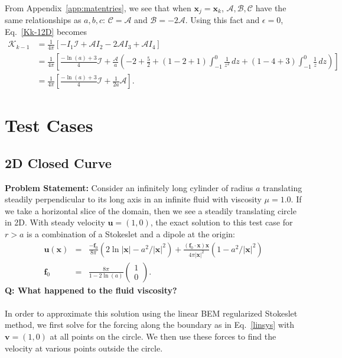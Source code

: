 \documentclass[12pt]{article}
\newcommand{\bx}{\mathbf{x}}
\newcommand{\bu}{\mathbf{u}}
\newcommand{\bv}{\mathbf{v}}
\newcommand{\ff}{\mathbf{f}}
\newcommand{\eps}{\epsilon}
\newcommand{\baas}[1]{\begin{align*} #1 \end{align*}}
\begin{document}
	From Appendix~\ref{app:matentries}, we see that when $\bx_j = \bx_k$, $\mathcal{A},\mathcal{B},\mathcal{C}$ have the same relationships as $a,b,c$: $\mathcal{C} = \mathcal{A}$ and $\mathcal{B} = -2\mathcal{A}$. Using this fact and $\eps = 0$, Eq.~\eqref{Kk-12D} becomes
	\baas{
	\mathcal{K}_{k-1} & =  \frac{1}{4\pi}\left[- I_1\mathcal{I} + \mathcal{A} I_2 - 2\mathcal{A} I_3 + \mathcal{A} I_4\right] \\
	&= \frac{1}{4\pi}\left[\frac{-\ln(a) + 3}{4} \mathcal{I} + \frac{\mathcal{A}}{a}\left(- 2 + \frac{5}{2} + \left( 1 -2  +1 \right) \int_{-1}^0 \frac{1}{z^2} \, dz + (1 -4 +3) \int_{-1}^0 \frac{1}{z} \, dz \right)\right]\\
	& = \frac{1}{4\pi}\left[\frac{-\ln(a) + 3}{4} \mathcal{I} + \frac{1}{2a}\mathcal{A} \right].
	}	
	
	
	
	\section{Test Cases}
	
	\subsection{2D Closed Curve}\label{sec:2Dclosedcurve} 
	\textbf{Problem Statement:} Consider an infinitely long cylinder of radius $a$ translating steadily perpendicular to its long axis in an infinite fluid with viscosity $\mu=1.0$. If we take a horizontal slice of the domain, then we see a steadily translating circle in 2D. With steady velocity $\bu = (1,0)$, the exact solution to this test case for $r>a$ is a combination of a Stokeslet and a dipole at the origin:
	\begin{eqnarray}\label{exactsoln}
		\bu(\bx) &=& \frac{-\ff_0}{8\pi}\left( 2\ln\lvert\bx\rvert - a^2/\lvert \bx \rvert^2 \right) + \frac{\left(\ff_0 \cdot \bx \right)\bx}{4\pi\lvert \bx \rvert^2}\left(1-a^2/\lvert \bx \rvert^2\right) \nonumber \\
		\ff_0 &=& \frac{8\pi}{1-2\ln(a)}\begin{pmatrix} 1 \\ 0 \end{pmatrix}.
	\end{eqnarray}
	\textbf{Q: What happened to the fluid viscosity?}\\ \vspace{0.5mm} \\
	In order to approximate this solution using the linear BEM regularized Stokeslet method, we first solve for the forcing along the boundary as in Eq.~\eqref{linsys} with $\bv = (1,0)$ at all points on the circle. We then use these forces to find the velocity at various points outside the circle. 
	
\end{document}
